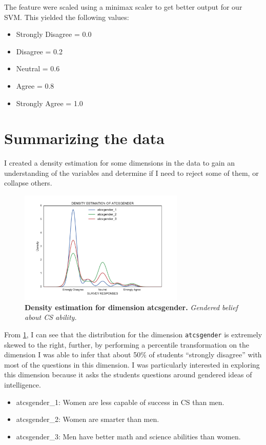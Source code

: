 The feature were scaled using a minimax scaler to get better output for our SVM. This yielded the following values:
\begin {itemize}
\item Strongly Disagree = 0.0
\item Disagree = 0.2
\item Neutral = 0.6
\item Agree = 0.8
\item Strongly Agree = 1.0
\end{itemize} 



\section*{Summarizing the data}
I created a density estimation for some dimensions in the data to gain an understanding of the variables and determine if I need to reject some of them, or collapse others. 

\begin{figure}[!hbtp]
\centering
    \caption{\textbf{Density estimation for dimension atcsgender. }\textit{Gendered belief about CS ability.}}\label{atcsgender_dimension}
    \includegraphics[width=0.7\textwidth]{figures/atcsgender_kde}
\end{figure}

From \ref{atcsgender_dimension}, I can see that the distribution for the dimension \texttt{atcsgender} is extremely skewed to the right, further, by performing a percentile transformation on the dimension I was able to infer that about 50\% of students ``strongly disagree'' with most of the questions in this dimension. I was particularly interested in exploring this dimension because it asks the students questions around gendered ideas of intelligence.
\begin {itemize}
\item atcsgender\_1: Women are less capable of success in CS than men.
\item atcsgender\_2: Women are smarter than men.
\item atcsgender\_3: Men have better math and science abilities than women.
\end{itemize} 

